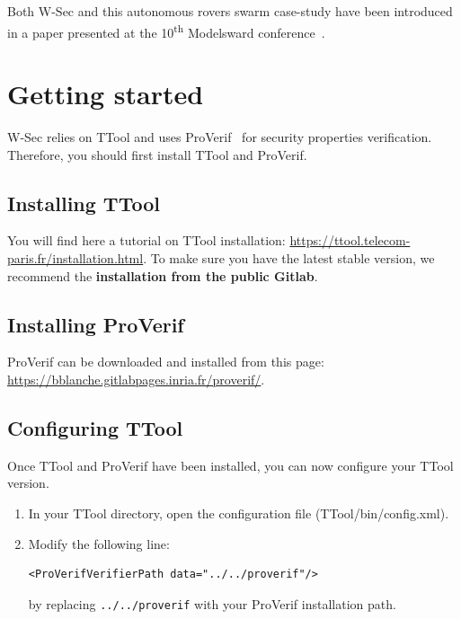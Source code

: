 \documentclass{article}
\begin{document}
Both W-Sec and this autonomous rovers swarm case-study have been introduced in a paper presented at the 10\textsuperscript{th} Modelsward conference~\cite{wsec}.


\tableofcontents
\newpage


\section{Getting started}

W-Sec relies on TTool and uses ProVerif~\cite{proverif} for security properties verification. Therefore, you should first install TTool and ProVerif.

\subsection{Installing TTool}

You will find here a tutorial on TTool installation: \url{https://ttool.telecom-paris.fr/installation.html}. To make sure you have the latest stable version, we recommend the \textbf{installation from the public Gitlab}.

\subsection{Installing ProVerif}

ProVerif can be downloaded and installed from this page: \url{https://bblanche.gitlabpages.inria.fr/proverif/}.

\subsection{Configuring TTool}

Once TTool and ProVerif have been installed, you can now configure your TTool version.
\begin{enumerate}
	\item In your TTool directory, open the configuration file (TTool/bin/config.xml).
	\item Modify the following line: \begin{verbatim}<ProVerifVerifierPath data="../../proverif"/>\end{verbatim} by replacing \texttt{../../proverif} with your ProVerif installation path.
\end{enumerate}
\end{document}
